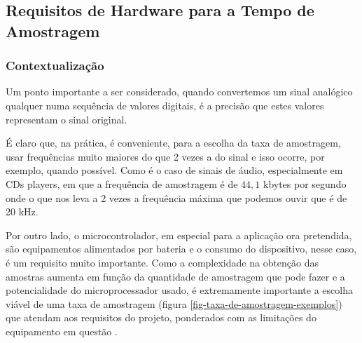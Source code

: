 	\subsection{Requisitos de Hardware para a Tempo de Amostragem}
		
		\subsubsection{Contextualização}
		
		Um ponto importante a ser considerado, quando convertemos um sinal analógico qualquer numa sequência de valores digitais, é a precisão que estes valores representam o sinal original. 
		
		É claro que, na prática, é conveniente, para a escolha da taxa de amostragem, usar frequências muito maiores do que 2 vezes a do sinal e isso ocorre, por exemplo, quando possível.  Como é o caso  de sinais de áudio, especialmente em  CDs players,  em  que  a frequência de amostragem é de $44,1$ kbytes por segundo onde o que nos leva a 2 vezes a frequência máxima que podemos ouvir que é de 20 kHz.
		
		Por outro lado, o microcontrolador, em especial para a aplicação ora pretendida, são equipamentos alimentados por bateria e o consumo do dispositivo, nesse caso, é um requisito muito importante. Como a complexidade na obtenção das amostras aumenta em função da quantidade de amostragem que pode fazer e a potencialidade do microprocessador usado, é extremamente importante a escolha viável de uma taxa de amostragem (figura \ref{fig-taxa-de-amostragem-exemplos}) que atendam aos requisitos do projeto, ponderados com as limitações do equipamento em questão \cite{Braga2012}.
		
